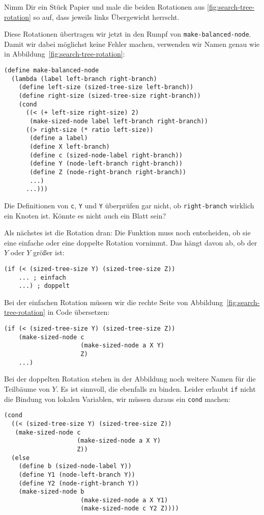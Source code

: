 \begin{aufgabeinline}
  Nimm Dir ein Stück Papier und male die beiden Rotationen aus
  \ref{fig:search-tree-rotation} so auf, dass jeweils links
  Übergewicht herrscht.
\end{aufgabeinline}
%
Diese Rotationen übertragen wir jetzt in den Rumpf von
\lstinline{make-balanced-node}.  Damit wir dabei möglichst keine
Fehler machen, verwenden wir Namen genau wie in
Abbildung~\ref{fig:search-tree-rotation}:
%
\begin{lstlisting}
(define make-balanced-node
  (lambda (label left-branch right-branch)
    (define left-size (sized-tree-size left-branch))
    (define right-size (sized-tree-size right-branch))
    (cond
      ((< (+ left-size right-size) 2)
       (make-sized-node label left-branch right-branch))
      ((> right-size (* ratio left-size))
       (define a label)
       (define X left-branch)
       (define c (sized-node-label right-branch))
       (define Y (node-left-branch right-branch))
       (define Z (node-right-branch right-branch))
       ...)
      ...)))
\end{lstlisting}
%
\begin{aufgabeinline}
  Die Definitionen von \lstinline{c}, \lstinline{Y} und \lstinline{Y}
  überprüfen gar nicht, ob \lstinline{right-branch} wirklich ein
  Knoten ist.  Könnte es nicht auch ein Blatt sein?
\end{aufgabeinline}
%
Als nächstes ist die Rotation dran: Die Funktion muss noch
entscheiden, ob sie eine einfache oder eine doppelte Rotation
vornimmt.  Das hängt davon ab, ob der $Y$ oder $Y$ größer ist:
%
\begin{lstlisting}
(if (< (sized-tree-size Y) (sized-tree-size Z))
    ... ; einfach
    ...) ; doppelt
\end{lstlisting}
%
Bei der einfachen Rotation müssen wir die rechte Seite von
Abbildung~\ref{fig:search-tree-rotation} in Code übersetzen:
%
\begin{lstlisting}
(if (< (sized-tree-size Y) (sized-tree-size Z))
    (make-sized-node c
                     (make-sized-node a X Y)
                     Z)
    ...)
\end{lstlisting}
%
Bei der doppelten Rotation stehen in der Abbildung noch weitere Namen
für die Teilbäume von $Y$.  Es ist sinnvoll, die ebenfalls zu binden.
Leider erlaubt \lstinline{if} nicht die Bindung von lokalen Variablen,
wir müssen daraus ein \lstinline{cond} machen:
%
\begin{lstlisting}
(cond
  ((< (sized-tree-size Y) (sized-tree-size Z))
   (make-sized-node c
                    (make-sized-node a X Y)
                    Z))
  (else
    (define b (sized-node-label Y))
    (define Y1 (node-left-branch Y))
    (define Y2 (node-right-branch Y))
    (make-sized-node b
                     (make-sized-node a X Y1)
                     (make-sized-node c Y2 Z))))
\end{lstlisting}
